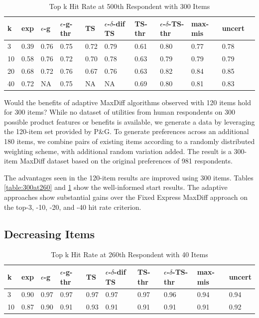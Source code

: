 \documentclass[a4paper,11pt]{article}
\newcommand{\fixedexpressS}{\textbf{exp}}
\newcommand{\egreedyS}{$\epsilon$-\textbf{g}}
\newcommand{\egreedythresS}{$\epsilon$-\textbf{g-thr}}
\newcommand{\misminS}{\textbf{max-mis}}
\newcommand{\tsS}{\textbf{TS} }
\newcommand{\edtsS}{$\epsilon$-$\delta$-\textbf{dif TS} }
\newcommand{\tsthresS}{\textbf{TS-thr} }
\newcommand{\edtsthresS}{$\epsilon$-$\delta$-\textbf{TS-thr} }
\newcommand{\uncertS}{\textbf{uncert} }
\begin{document}
\begin{table}
\caption{Top k Hit Rate at 500th Respondent with 300 Items}
\begin{center}
\begin{tabular}{lllllllllll}
\hline   k &  \fixedexpressS & \egreedyS&\egreedythresS&\tsS&\edtsS&\tsthresS&\edtsthresS& \misminS& \uncertS  \\ \hline  
3 & 0.39 &  0.76 & 0.75 & 0.72 & 0.79 & 0.61 &  0.80 &  0.77 &0.78 \\
10 &  0.58 &   0.76 & 0.72 & 0.70 & 0.78 & 0.63 & 0.79 & 0.79 &   0.79\\
20 & 0.68 & 0.72 & 0.76 & 0.67 & 0.76 &  0.63 & 0.82 & 0.84 &    0.85 \\ 
40 & 0.72 &   NA & 0.75 & NA & NA & 0.69 & 0.80 &0.81 & 0.83 \end{tabular}
\end{center}
\label{table:300at500}
\end{table}
Would the benefits of adaptive MaxDiff algorithms observed with 120 items hold for 300 items? While no dataset of utilities from human respondents on 300 possible product features or benefits is available, we generate a data by leveraging the 120-item set provided by P\&G. To generate preferences across an additional 180 items, we combine pairs of existing items according to a randomly distributed weighting scheme, with additional random variation added. The result is a 300-item MaxDiff dataset based on the original preferences of 981 respondents.

The advantages seen in the 120-item results are improved using 300 items. Tables \ref{table:300at260} and \ref{table:300at500} show the well-informed start results. The adaptive approaches show substantial gains over the Fixed Express MaxDiff approach on the top-3, -10, -20, and -40 hit rate criterion.

\subsection{Decreasing Items}

\begin{table}
\caption{Top k Hit Rate at 260th Respondent with 40 Items}
\begin{center}
\begin{tabular}{llllllllll}
\hline   k &  \fixedexpressS & \egreedyS&\egreedythresS&\tsS&\edtsS&\tsthresS&\edtsthresS& \misminS& \uncertS  \\ \hline  3 & 0.90 & 0.97 &  0.97 &  0.97 & 0.97 & 0.97 &  0.96 & 0.94 &  0.94 \\  10 & 0.87 & 0.90 & 0.91 &  0.93 & 0.91 & 0.91 & 0.91 & 0.91 &  0.92  \end{tabular}
\end{center}
\label{table:40at260}
\end{table}
\end{document}
